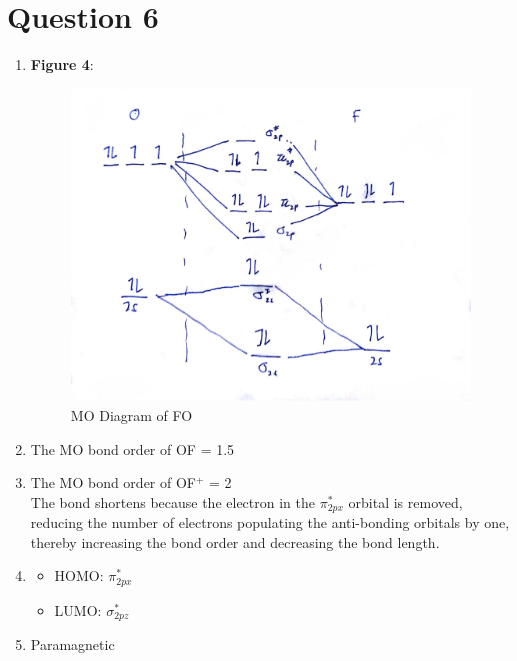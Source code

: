 \documentclass[a4paper, fleqn]{article}
\begin{document}
\section{Question 6}
\begin{enumerate}[label=(\alph{*})]
\item \textbf{Figure 4}:\begin{figure}[h!]
\includegraphics[width=\linewidth]{./assets/201802120711.jpg}
\caption{MO Diagram of FO}
\label{figure:graph4}
\end{figure}
\item The MO bond order of OF = 1.5
\item The MO bond order of OF$^+$ = 2\\
The bond shortens because the electron in the $\pi_{2px}^*$ orbital is removed, reducing the number of electrons populating the anti-bonding orbitals by one, thereby increasing the bond order and decreasing the bond length.
\item \begin{itemize}
\item HOMO: $\pi_{2px}^*$
\item LUMO: $\sigma_{2pz}^*$
\end{itemize}
\item Paramagnetic
\end{enumerate}
\end{document}
